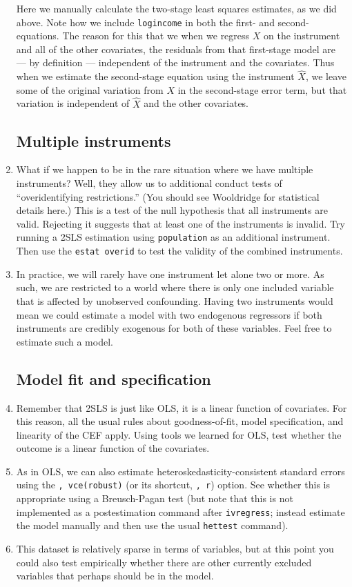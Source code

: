 \documentclass[a4paper,12pt]{article}
\begin{document}
\begin{enumerate}
Here we manually calculate the two-stage least squares estimates, as we did above. Note how we include \texttt{logincome} in both the first- and second-equations. The reason for this that we when we regress $X$ on the instrument and all of the other covariates, the residuals from that first-stage model are --- by definition --- independent of the instrument and the covariates. Thus when we estimate the second-stage equation using the instrument $\hat{X}$, we leave some of the original variation from $X$ in the second-stage error term, but that variation is independent of $\hat{X}$ and the other covariates.

\subsection*{Multiple instruments}

\item What if we happen to be in the rare situation where we have multiple instruments? Well, they allow us to additional conduct tests of ``overidentifying restrictions.'' (You should see Wooldridge for statistical details here.) This is a test of the null hypothesis that all instruments are valid. Rejecting it suggests that at least one of the instruments is invalid. Try running a 2SLS estimation using \texttt{population} as an additional instrument. Then use the \texttt{estat overid} to test the validity of the combined instruments. 
\item In practice, we will rarely have one instrument let alone two or more. As such, we are restricted to a world where there is only one included variable that is affected by unobserved confounding. Having two instruments would mean we could estimate a model with two endogenous regressors if both instruments are credibly exogenous for both of these variables. Feel free to estimate such a model.

\subsection*{Model fit and specification}

\item Remember that 2SLS is just like OLS, it is a linear function of covariates. For this reason, all the usual rules about goodness-of-fit, model specification, and linearity of the CEF apply. Using tools we learned for OLS, test whether the outcome is a linear function of the covariates.
\item As in OLS, we can also estimate heteroskedasticity-consistent standard errors using the \texttt{, vce(robust)} (or its shortcut, \texttt{, r}) option. See whether this is appropriate using a Breusch-Pagan test (but note that this is not implemented as a postestimation command after \texttt{ivregress}; instead estimate the model manually and then use the usual \texttt{hettest} command).
\item This dataset is relatively sparse in terms of variables, but at this point you could also test empirically whether there are other currently excluded variables that perhaps should be in the model.


\end{enumerate}
\end{document}
